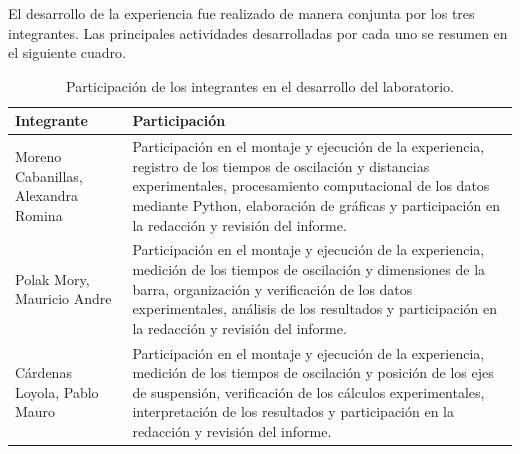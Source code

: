 \documentclass[11pt,a4paper]{article}
\begin{document}
El desarrollo de la experiencia fue realizado de manera conjunta por los
tres integrantes. Las principales actividades desarrolladas por cada uno
se resumen en el siguiente cuadro.

\begin{table}[H]
    \centering
    \small
    \renewcommand{\arraystretch}{1.25}
    \setlength{\tabcolsep}{8pt}

    \begin{tabular}{
        >{\raggedright\arraybackslash}p{}
        >{\raggedright\arraybackslash}p{}
    }
        \toprule

        \textbf{Integrante} &
        \textbf{Participación} \\

        \midrule

        Moreno Cabanillas, Alexandra Romina &
        Participación en el montaje y ejecución de la experiencia,
        registro de los tiempos de oscilación y distancias experimentales,
        procesamiento computacional de los datos mediante Python,
        elaboración de gráficas y participación en la redacción y revisión
        del informe. \\

        \addlinespace

        Polak Mory, Mauricio Andre &
        Participación en el montaje y ejecución de la experiencia,
        medición de los tiempos de oscilación y dimensiones de la barra,
        organización y verificación de los datos experimentales,
        análisis de los resultados y participación en la redacción y
        revisión del informe. \\

        \addlinespace

        Cárdenas Loyola, Pablo Mauro &
        Participación en el montaje y ejecución de la experiencia,
        medición de los tiempos de oscilación y posición de los ejes de
        suspensión, verificación de los cálculos experimentales,
        interpretación de los resultados y participación en la redacción
        y revisión del informe. \\

        \bottomrule
    \end{tabular}

    \caption{Participación de los integrantes en el desarrollo del laboratorio.}
    \label{tab:participacion_integrantes}
\end{table}
\end{document}
